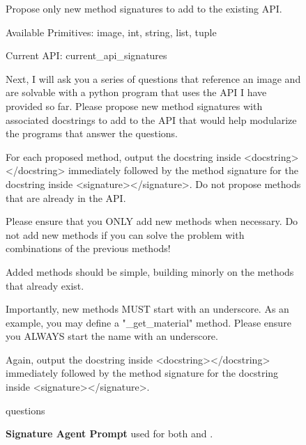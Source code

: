 \clearpage
{}

\begin{figure*}[t]
\centering
\begin{prompt}
Propose only new method signatures to add to the existing API.

Available Primitives: image, int, string, list, tuple

Current API:
{current_api_signatures}

Next, I will ask you a series of questions that reference an image and are solvable with a python program that uses the API I have provided so far. Please propose new method signatures with associated docstrings to add to the API that would help modularize the programs that answer the questions. 

For each proposed method, output the docstring inside <docstring></docstring> immediately followed by the method signature for the docstring inside <signature></signature>. Do not propose methods that are already in the API.

Please ensure that you ONLY add new methods when necessary. Do not add new methods if you can solve the problem with combinations of the previous methods!

Added methods should be simple, building minorly on the methods that already exist.

Importantly, new methods MUST start with an underscore. As an example, you may define a "_get_material" method. Please ensure you ALWAYS start the name with an underscore.

Again, output the docstring inside <docstring></docstring> immediately followed by the method signature for the docstring inside <signature></signature>.

{questions}
\end{prompt}
\caption{\textbf{Signature Agent Prompt} used for both \clevr and \ourbench.}
\label{fig:signature_agent_prompt}
\end{figure*}